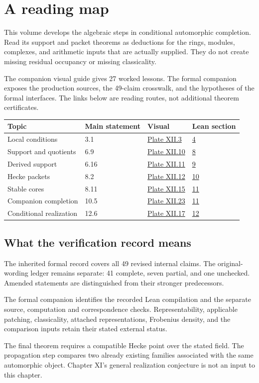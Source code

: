 \section*{A reading map}
This volume develops the algebraic steps in conditional automorphic completion. Read its support and packet theorems as deductions for the rings, modules, complexes, and arithmetic inputs that are actually supplied. They do not create missing residual occupancy or missing classicality.

The companion visual guide gives 27 worked lessons. The formal companion exposes the production sources, the 49-claim crosswalk, and the hypotheses of the formal interfaces. The links below are reading routes, not additional theorem certificates.

\begin{center}\begin{tabular}{>{\raggedright\arraybackslash}p{.30\linewidth}lll}\toprule
Topic & Main statement & Visual & Lean section\\\midrule
Local conditions & 3.1 & \href{p12-route:main-v-3}{Plate XII.3} & \href{p12-route:main-l-3.1}{4}\\
Support and quotients & 6.9 & \href{p12-route:main-v-10}{Plate XII.10} & \href{p12-route:main-l-6.9}{8}\\
Derived support & 6.16 & \href{p12-route:main-v-11}{Plate XII.11} & \href{p12-route:main-l-6.16}{9}\\
Hecke packets & 8.2 & \href{p12-route:main-v-12}{Plate XII.12} & \href{p12-route:main-l-8.2}{10}\\
Stable cores & 8.11 & \href{p12-route:main-v-15}{Plate XII.15} & \href{p12-route:main-l-8.11}{11}\\
Companion completion & 10.5 & \href{p12-route:main-v-23}{Plate XII.23} & \href{p12-route:main-l-10.5}{11}\\
Conditional realization & 12.6 & \href{p12-route:main-v-17}{Plate XII.17} & \href{p12-route:main-l-12.6}{12}\\
\bottomrule\end{tabular}\end{center}
\subsection*{What the verification record means}
The inherited formal record covers all 49 revised internal claims. The original-wording ledger remains separate: 41 complete, seven partial, and one unchecked. Amended statements are distinguished from their stronger predecessors.

The formal companion identifies the recorded Lean compilation and the separate source, computation and correspondence checks. Representability, applicable patching, classicality, attached representations, Frobenius density, and the comparison inputs retain their stated external status.

The final theorem requires a compatible Hecke point over the stated field. The propagation step compares two already existing families associated with the same automorphic object. Chapter XI's general realization conjecture is not an input to this chapter.
\clearpage
{\setlength{\parskip}{0pt}\tableofcontents}
\clearpage
